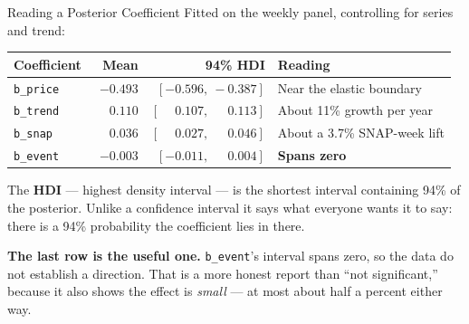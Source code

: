 \documentclass[aspectratio=169, 11pt]{beamer}
\begin{document}
\begin{frame}{Reading a Posterior Coefficient}
  Fitted on the weekly panel, controlling for series and trend:
  \begin{center}
    {\small
    \begin{tabular}{lrrl}
      \toprule
      \textbf{Coefficient} & \textbf{Mean} & \textbf{94\% HDI} & \textbf{Reading} \\
      \midrule
      \texttt{b\_price} & $-0.493$ & $[-0.596,\ -0.387]$ & Near the elastic boundary \\
      \texttt{b\_trend} & $\phantom{-}0.110$ & $[\phantom{-}0.107,\ \phantom{-}0.113]$ & About 11\% growth per year \\
      \texttt{b\_snap} & $\phantom{-}0.036$ & $[\phantom{-}0.027,\ \phantom{-}0.046]$ & About a 3.7\% SNAP-week lift \\
      \texttt{b\_event} & $-0.003$ & $[-0.011,\ \phantom{-}0.004]$ & \textbf{Spans zero} \\
      \bottomrule
    \end{tabular}
    }
  \end{center}

  \vspace{-0.05cm}
  The \textbf{HDI} --- highest density interval --- is the shortest interval containing 94\% of
  the posterior. Unlike a confidence interval it says what everyone wants it to say: there is a
  94\% probability the coefficient lies in there.

  \vspace{0.15cm}
  \textbf{The last row is the useful one.} \texttt{b\_event}'s interval spans zero, so the data
  do not establish a direction. That is a more honest report than ``not significant,'' because it
  also shows the effect is \emph{small} --- at most about half a percent either way.
\end{frame}
\end{document}

